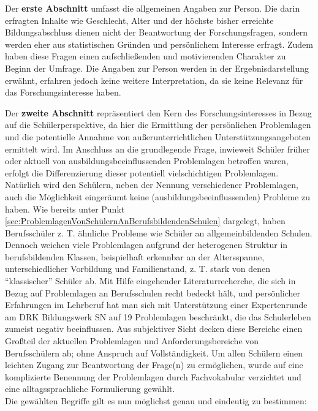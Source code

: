 Der \textbf{erste Abschnitt} umfasst die allgemeinen Angaben zur Person. Die darin erfragten Inhalte wie Geschlecht, Alter und der höchste bisher erreichte Bildungsabschluss dienen nicht der Beantwortung der Forschungsfragen, sondern werden eher aus statistischen Gründen und persönlichem Interesse erfragt. Zudem haben diese Fragen einen aufschließenden und motivierenden Charakter zu Beginn der Umfrage. Die Angaben zur Person werden in der Ergebnisdarstellung erwähnt, erfahren jedoch keine weitere Interpretation, da sie keine Relevanz für das Forschungsinteresse haben.

Der \textbf{zweite Abschnitt} repräsentiert den Kern des Forschungsinteresses in Bezug auf die Schülerperspektive, da hier die Ermittlung der persönlichen Problemlagen und die potentielle Annahme von außerunterrichtlichen Unterstützungsangeboten ermittelt wird. Im Anschluss an die grundlegende Frage, inwieweit Schüler früher oder aktuell von ausbildungsbeeinflussenden Problemlagen betroffen waren, erfolgt die Differenzierung dieser potentiell vielschichtigen Problemlagen. Natürlich wird den Schülern, neben der Nennung verschiedener Problemlagen, auch die Möglichkeit eingeräumt keine (ausbildungsbeeinflussenden) Probleme zu haben. Wie bereits unter Punkt \ref{sec:ProblemlagenVonSchülernAnBerufsbildendenSchulen} dargelegt, haben Berufsschüler z. T. ähnliche Probleme wie Schüler an allgemeinbildenden Schulen. Dennoch weichen viele Problemlagen aufgrund der heterogenen Struktur in berufsbildenden Klassen, beispielhaft erkennbar an der Altersspanne, unterschiedlicher Vorbildung und Familienstand, z. T. stark von denen "`klassischer"' Schüler ab. Mit Hilfe eingehender Literaturrecherche, die sich in Bezug auf Problemlagen an Berufsschulen recht bedeckt hält, und persönlicher Erfahrungen im Lehrberuf hat man sich mit Unterstützung einer Expertenrunde am DRK Bildungswerk SN auf 19 Problemlagen beschränkt, die das Schulerleben zumeist negativ beeinflussen. Aus subjektiver Sicht decken diese Bereiche einen Großteil der aktuellen Problemlagen und Anforderungsbereiche von Berufsschülern ab; ohne Anspruch auf  Vollständigkeit. Um allen Schülern einen leichten Zugang zur Beantwortung der Frage(n) zu ermöglichen, wurde auf eine komplizierte Benennung der Problemlagen durch Fachvokabular verzichtet und eine alltagssprachliche Formulierung gewählt.\\

\noindent
Die gewählten Begriffe gilt es nun möglichst genau und eindeutig zu bestimmen:\\

